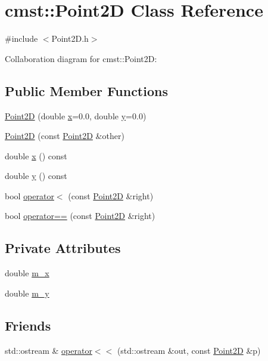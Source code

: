 \hypertarget{classcmst_1_1_point2_d}{}\section{cmst::Point2D Class Reference}
\label{classcmst_1_1_point2_d}


{\ttfamily \#include $<$Point2D.h$>$}



Collaboration diagram for cmst::Point2D:
\subsection*{Public Member Functions}
\begin{DoxyCompactItemize}
\item 
\hyperlink{classcmst_1_1_point2_d_a2291fb012502a29399852810b5a081a8}{Point2D} (double \hyperlink{classcmst_1_1_point2_d_a7745045ba529c4f2a2a0384974a42448}{x}=0.0, double \hyperlink{classcmst_1_1_point2_d_a15a4383f1c181b7c7518ccac6f578564}{y}=0.0)
\item 
\hyperlink{classcmst_1_1_point2_d_a24e903416a709a44f844b93c7295ed67}{Point2D} (const \hyperlink{classcmst_1_1_point2_d}{Point2D} \&other)
\item 
double \hyperlink{classcmst_1_1_point2_d_a7745045ba529c4f2a2a0384974a42448}{x} () const 
\item 
double \hyperlink{classcmst_1_1_point2_d_a15a4383f1c181b7c7518ccac6f578564}{y} () const 
\item 
bool \hyperlink{classcmst_1_1_point2_d_a07c101f4fb6663aaa6c32de475a149fe}{operator$<$} (const \hyperlink{classcmst_1_1_point2_d}{Point2D} \&right)
\item 
bool \hyperlink{classcmst_1_1_point2_d_a9544f3c9e53240832f8323e75d75a042}{operator==} (const \hyperlink{classcmst_1_1_point2_d}{Point2D} \&right)
\end{DoxyCompactItemize}
\subsection*{Private Attributes}
\begin{DoxyCompactItemize}
\item 
double \hyperlink{classcmst_1_1_point2_d_ae531b08a2a67babee5b677b4b7e79ea9}{m\_x}
\item 
double \hyperlink{classcmst_1_1_point2_d_a24414f1e4970aa89c3d7137a9e7955a5}{m\_y}
\end{DoxyCompactItemize}
\subsection*{Friends}
\begin{DoxyCompactItemize}
\item 
std::ostream \& \hyperlink{classcmst_1_1_point2_d_a538910ff384fb4f3f02d785a99e222cf}{operator$<$$<$} (std::ostream \&out, const \hyperlink{classcmst_1_1_point2_d}{Point2D} \&p)
\end{DoxyCompactItemize}


